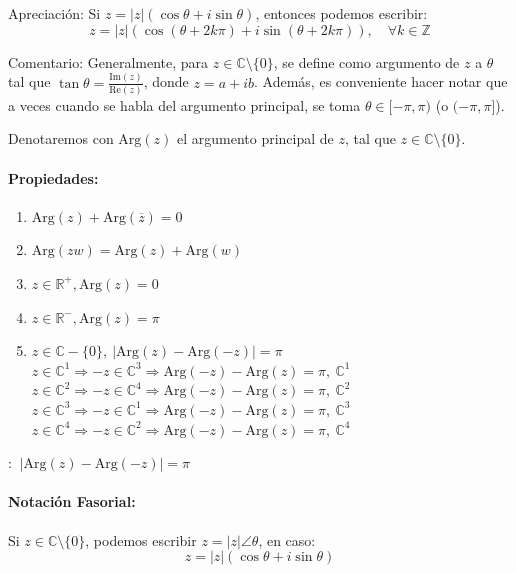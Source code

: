\documentclass[a4paper,12pt]{article}
\begin{document}
\begin{enumerate}
Apreciación:
Si $z = |z|(\cos \theta + i \sin \theta)$, entonces podemos escribir:
\[
z = |z|(\cos(\theta + 2k\pi) + i \sin(\theta + 2k\pi)), \quad \forall k \in \mathbb{Z}
\]

Comentario: Generalmente, para $z \in \mathbb{C} \setminus \{0\}$, se define como argumento de $z$ a $\theta$ tal que $\tan \theta = \frac{\text{Im}(z)}{\text{Re}(z)}$, donde $z = a + ib$. Además, es conveniente hacer notar que a veces cuando se habla del argumento principal, se toma $\theta \in [-\pi, \pi)$ (o $(-\pi, \pi]$).

Denotaremos con $\text{Arg}(z)$ el argumento principal de $z$, tal que $z \in \mathbb{C} \setminus \{0\}$.

\paragraph{Propiedades:}
\begin{enumerate}
    \item $\text{Arg}(z) + \text{Arg}(\overline{z}) = 0$
    \item $\text{Arg}(zw) = \text{Arg}(z) + \text{Arg}(w)$
    \item $z \in \mathbb{R}^+, \text{Arg}(z) = 0$
    \item $z \in \mathbb{R}^-, \text{Arg}(z) = \pi$
    \item $z \in \mathbb{C} - \{0\},\ |\text{Arg}(z) - \text{Arg}(-z)| = \pi$ 
    \newline {} $z \in \mathbb{C}^1 \Rightarrow -z \in \mathbb{C}^3 \Rightarrow \text{Arg}(-z) - \text{Arg}(z) = \pi ,\ \mathbb{C}^1$ 
    \newline {} $z \in \mathbb{C}^2 \Rightarrow -z \in \mathbb{C}^4 \Rightarrow \text{Arg}(-z) - \text{Arg}(z) = \pi ,\ \mathbb{C}^2$ 
    \newline {} $z \in \mathbb{C}^3 \Rightarrow -z \in \mathbb{C}^1 \Rightarrow \text{Arg}(-z) - \text{Arg}(z) = \pi ,\ \mathbb{C}^3$ 
    \newline {} $z \in \mathbb{C}^4 \Rightarrow -z \in \mathbb{C}^2 \Rightarrow \text{Arg}(-z) - \text{Arg}(z) = \pi ,\ \mathbb{C}^4$ 
\end{enumerate}


 : $\ |\text{Arg}(z) - \text{Arg}(-z)| = \pi $



\paragraph{Notación Fasorial:} 
Si $z \in \mathbb{C} \setminus \{0\}$, podemos escribir $z = |z| \angle \theta$, en caso:
\[
z = |z|(\cos \theta + i \sin \theta)
\]


\end{enumerate}
\end{document}
